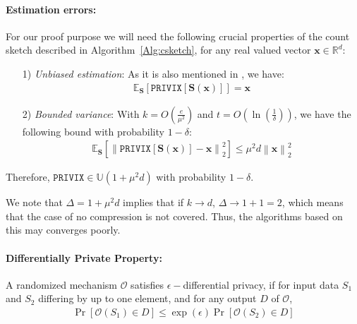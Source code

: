 \paragraph{Estimation errors:}

\begin{property}
For our proof purpose we will need the following crucial properties of the count sketch described in Algorithm~\ref{Alg:csketch}, for any real valued vector $\mathbf{x}\in \mathbb{R}^{d}$:
\begin{itemize}
    \item[1)] \emph{Unbiased estimation}: As it is also mentioned in \cite{li2019privacy}, we have:
    \begin{align}
        \mathbb{E}_{\mathbf{S}}\left[\texttt{PRIVIX}\left[\mathbf{S}\left(\mathbf{x}\right)\right]\right]=\mathbf{x}
    \end{align}
    
    \item[2)] \emph{Bounded variance}: With $k=O\left(\frac{e}{\mu^2}\right)$ and $t=O\left(\ln \left(\frac{1}{\delta}\right)\right)$, we have the following bound with probability $1-\delta$:
    \begin{align}
        \mathbb{E}_{\mathbf{S}}\left[\left\|\texttt{PRIVIX}\left[\mathbf{S}\left(\mathbf{x}\right)\right]-\mathbf{x}\right\|_2^2\right]\leq \mu^2 d\left\|\mathbf{x}\right\|_2^2
    \end{align}
\end{itemize}
\end{property}
Therefore, $\texttt{PRIVIX}\in \mathbb{U}(1+\mu^2 d)$ with probability $1-\delta$.
\begin{remark}
We note that $\Delta=1+\mu^2d$ implies that if $k\rightarrow d$, $\Delta\rightarrow 1+1=2$, which means that the case of no compression is not covered. Thus, the algorithms based on this may converges poorly.
\end{remark}

\paragraph{Differentially Private Property:}
\begin{definition}
A randomized mechanism $\mathcal{O}$ satisfies $\epsilon-$differential privacy, if for input data ${S}_1$ and ${S}_2$ differing by up to one element, and for any output $D$ of $\mathcal{O}$,
\begin{align}
    \Pr\left[\mathcal{O}(S_1)\in D\right]\leq \exp{\left(\epsilon\right)}\Pr\left[\mathcal{O}(S_2)\in D\right] 
\end{align}
\end{definition}

